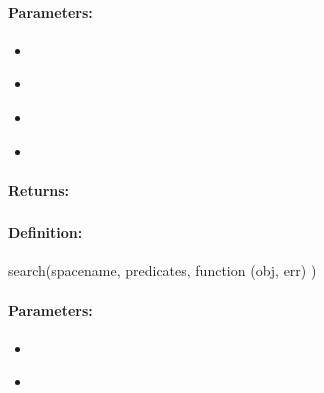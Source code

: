\paragraph{Parameters:}
\begin{itemize}[noitemsep]
\item {}\\

\item {}\\

\item {}\\

\item {}\\

\end{itemize}

\paragraph{Returns:}


\pagebreak
\subsubsection{}
\label{api:nodejs:search}


\paragraph{Definition:}
\begin{javascriptcode}
search(spacename, predicates, function (obj, err) {})
\end{javascriptcode}
\paragraph{Parameters:}
\begin{itemize}[noitemsep]
\item {}\\

\item {}\\

\end{itemize}

